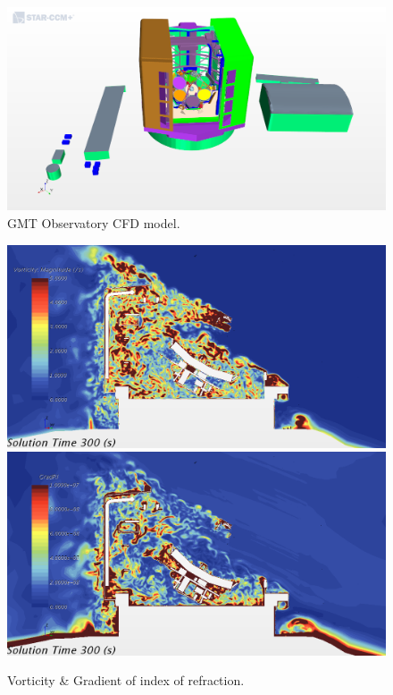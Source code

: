 \documentclass[]{AO4ELT}  %
\begin{document}
\begin{figure}
   \centering
   \includegraphics[trim= 0 0 0 2cm,clip,width=0.95\linewidth]{zen30az000_OS7_Geometry Scene 2.png}
   \caption{GMT Observatory CFD model.}
   \label{fig:6}
\end{figure}

\begin{figure}
   \centering
   \includegraphics[width=0.495\linewidth]{vort_tel_vort_tel_3.000000e+02.png}
   \includegraphics[width=0.495\linewidth]{RI_tel_RI_tel_3.000000e+02.png}
   \caption{Vorticity \& Gradient of index of refraction.}
   \label{fig:7}
\end{figure}
\end{document}
